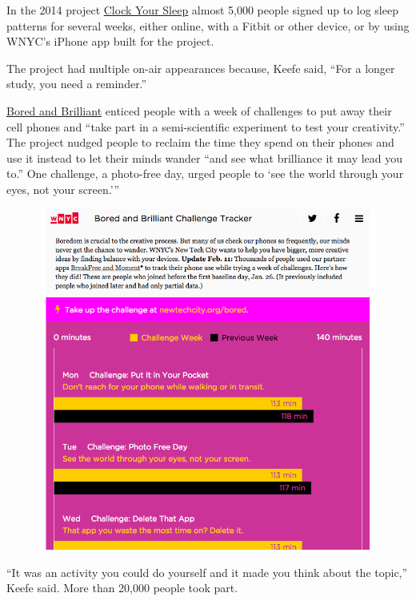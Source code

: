 \documentclass[notoc, symmetric, nobib, nols]{towcenter-guideto-book}
\begin{document}
In the 2014 project \href{http://www.wnyc.org/story/clock-your-sleep-findings/}{Clock Your Sleep}\autocite{Sleep} almost 5,000 people signed up to log sleep patterns for several weeks, either online, with a Fitbit or other device, or by using WNYC's iPhone app built for the project. 

The project had multiple on-air appearances because, Keefe said, ``For a longer study, you need a reminder.''

\href{http://www.wnyc.org/series/bored-and-brilliant/}{Bored and Brilliant}\autocite{Bored} enticed people with a week of challenges to put away their cell phones and ``take part in a semi-scientific experiment to test your creativity.'' The project nudged people to reclaim the time they spend on their phones and use it instead to let their minds wander ``and see what brilliance it may lead you to.” One challenge, a photo-free day, urged people to `see the world through your eyes, not your screen.'''

\begin{figure}
\includegraphics{graphics/CrowdsourcingWNYCBredAndBrilliant.png}
\end{figure}

``It was an activity you could do yourself and it made you think about the topic,'' Keefe said. More than 20,000 people took part.
\end{document}
